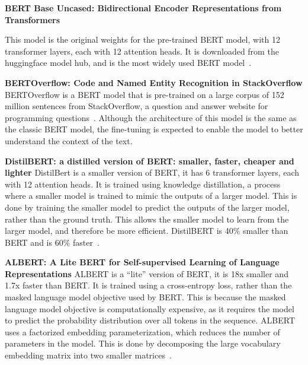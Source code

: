 \documentclass{UoYCSproject}
\begin{document}
    \par

    \textbf{BERT Base Uncased: Bidirectional Encoder Representations from Transformers}

    This model is the original weights for the pre-trained BERT model, with 12 transformer layers, each with 12 attention heads.
    It is downloaded from the huggingface model hub, and is the most widely used BERT model~\cite{bert-base-uncased}.
    \par

    \textbf{BERTOverflow: Code and Named Entity Recognition in StackOverflow}
    BERTOverflow is a BERT model that is pre-trained on a large corpus of 152 million sentences from StackOverflow, a question and answer website for programming questions~\cite{tabassum2020code}.
    Although the architecture of this model is the same as the classic BERT model, the fine-tuning is expected to enable the model to better understand the context of the text.
    \par

    \textbf{DistilBERT: a distilled version of BERT: smaller, faster, cheaper and lighter}
    DistilBert is a smaller version of BERT, it has 6 transformer layers, each with 12 attention heads.
    It is trained using knowledge distillation, a process where a smaller model is trained to mimic the outputs of a larger model.
    This is done by training the smaller model to predict the outputs of the larger model, rather than the ground truth.
    This allows the smaller model to learn from the larger model, and therefore be more efficient.
    DistilBERT is 40\% smaller than BERT and is 60\% faster~\cite{sanh2020distilbert}.
    \par

    \textbf{ALBERT: A Lite BERT for Self-supervised Learning of Language Representations}
    ALBERT is a ``lite'' version of BERT, it is 18x smaller and 1.7x faster than BERT.
    It is trained using a cross-entropy loss, rather than the masked language model objective used by BERT.
    This is because the masked language model objective is computationally expensive, as it requires the model to predict the probability distribution over all tokens in the sequence.
    ALBERT uses a factorized embedding parameterization, which reduces the number of parameters in the model.
    This is done by decomposing the large vocabulary embedding matrix into two smaller matrices~\cite{sanh2020distilbert}.
    \par
\end{document}
